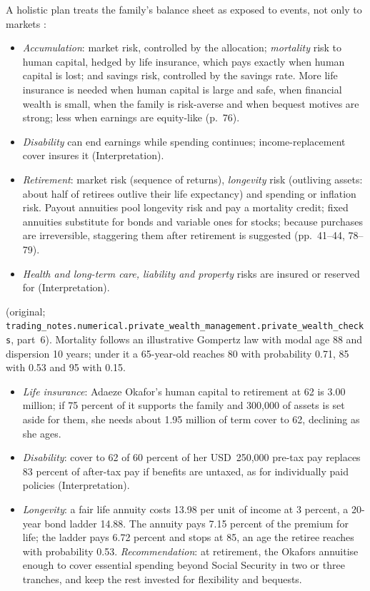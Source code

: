 \begin{qfmethod}\label{meth:lifetime-exposures}
 A holistic plan treats the family's balance sheet as exposed to events, not only to markets \citep[pp.~28--31, 41--44, 74--79]{ibbotson-lifetime-financial-advice-2007}:
\begin{itemize}
\item \emph{Accumulation}: market risk, controlled by the allocation; \emph{mortality} risk to human capital, hedged by life insurance, which pays exactly when human capital is lost; and savings risk, controlled by the savings rate. More life insurance is needed when human capital is large and safe, when financial wealth is small, when the family is risk-averse and when bequest motives are strong; less when earnings are equity-like (p.~76).
\item \emph{Disability} can end earnings while spending continues; income-replacement cover insures it (Interpretation).
\item \emph{Retirement}: market risk (sequence of returns), \emph{longevity} risk (outliving assets: about half of retirees outlive their life expectancy) and spending or inflation risk. Payout annuities pool longevity risk and pay a mortality credit; fixed annuities substitute for bonds and variable ones for stocks; because purchases are irreversible, staggering them after retirement is suggested (pp.~41--44, 78--79).
\item \emph{Health and long-term care, liability and property} risks are insured or reserved for (Interpretation).
\end{itemize}

 (original; \nolinkurl{trading_notes.numerical.private_wealth_management.private_wealth_checks}, part~6). Mortality follows an illustrative Gompertz law with modal age 88 and dispersion 10 years; under it a 65-year-old reaches 80 with probability 0.71, 85 with 0.53 and 95 with 0.15.
\begin{itemize}
\item \emph{Life insurance}: Adaeze Okafor's human capital to retirement at 62 is 3.00 million; if 75 percent of it supports the family and 300,000 of assets is set aside for them, she needs about 1.95 million of term cover to 62, declining as she ages.
\item \emph{Disability}: cover to 62 of 60 percent of her USD~250,000 pre-tax pay replaces 83 percent of after-tax pay if benefits are untaxed, as for individually paid policies (Interpretation).
\item \emph{Longevity}: a fair life annuity costs 13.98 per unit of income at 3 percent, a 20-year bond ladder 14.88. The annuity pays 7.15 percent of the premium for life; the ladder pays 6.72 percent and stops at 85, an age the retiree reaches with probability 0.53. \emph{Recommendation}: at retirement, the Okafors annuitise enough to cover essential spending beyond Social Security in two or three tranches, and keep the rest invested for flexibility and bequests.
\end{itemize}


\end{qfmethod}
